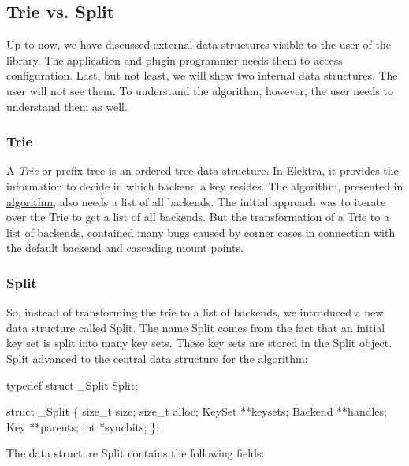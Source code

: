 \subsection*{Trie vs. Split}

Up to now, we have discussed external data structures visible to the user of the library. The application and plugin programmer needs them to access configuration. Last, but not least, we will show two internal data structures. The user will not see them. To understand the algorithm, however, the user needs to understand them as well.

\subsubsection*{Trie}

A {\itshape Trie} or prefix tree is an ordered tree data structure. In Elektra, it provides the information to decide in which backend a key resides. The algorithm, presented in \hyperlink{doc_dev_algorithm_md}{algorithm}, also needs a list of all backends. The initial approach was to iterate over the {\ttfamily Trie} to get a list of all backends. But the transformation of a {\ttfamily Trie} to a list of backends, contained many bugs caused by corner cases in connection with the default backend and cascading mount points.

\subsubsection*{Split}

So, instead of transforming the trie to a list of backends, we introduced a new data structure called {\ttfamily Split}. The name {\ttfamily Split} comes from the fact that an initial key set is split into many key sets. These key sets are stored in the {\ttfamily Split} object. {\ttfamily Split} advanced to the central data structure for the algorithm\+:


\begin{DoxyCode}
\textcolor{keyword}{typedef} \textcolor{keyword}{struct }\_Split   Split;

\textcolor{keyword}{struct }\_Split \{
        \textcolor{keywordtype}{size\_t} size;
        \textcolor{keywordtype}{size\_t} alloc;
        KeySet **keysets;
        Backend **handles;
        Key **parents;
        \textcolor{keywordtype}{int} *syncbits;
\};
\end{DoxyCode}


The data structure {\ttfamily Split} contains the following fields\+:


